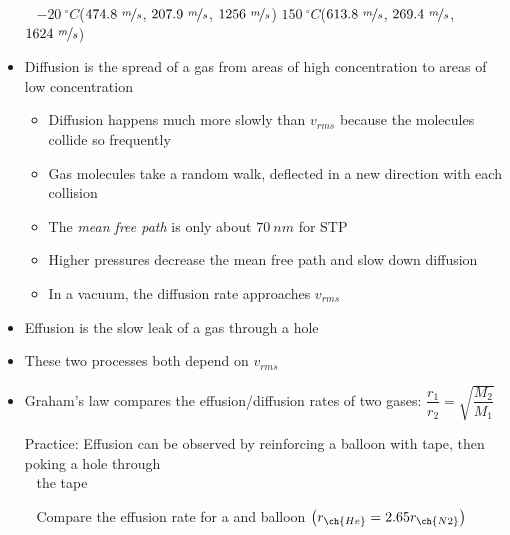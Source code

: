\documentclass[12pt, openany, letterpaper]{memoir}
\begin{document}
\begin{itemize}
	~\hphantom{Practice: } $-20~^\circ C$($474.8~\nicefrac{m}{s}$, $207.9~\nicefrac{m}{s}$, $1256~\nicefrac{m}{s}$)\hspace{1em} $150~^\circ C$($613.8~\nicefrac{m}{s}$, $269.4~\nicefrac{m}{s}$, $1624~\nicefrac{m}{s}$)
	\item Diffusion is the spread of a gas from areas of high concentration to areas of low concentration
	\begin{itemize}
		\item Diffusion happens much more slowly than $v_{rms}$ because the molecules collide so frequently
		\item Gas molecules take a random walk, deflected in a new direction with each collision
		\item The \emph{mean free path} is only about $70~nm$ for STP 
		\item Higher pressures decrease the mean free path and slow down diffusion
		\item In a vacuum, the diffusion rate approaches $v_{rms}$
	\end{itemize}
	\item Effusion is the slow leak of a gas through a hole
	\item These two processes both depend on $v_{rms}$
	\item Graham's law compares the effusion/diffusion rates of two gases: $\dfrac{r_1}{r_2}=\sqrt{\dfrac{M_2}{M_1}}$
	
	Practice: Effusion can be observed by reinforcing a balloon with tape, then poking a hole through\\
	~\hphantom{Practice: } the tape
	
	~\hphantom{Practice: } Compare the effusion rate for a  and  balloon $\left(r_{\ch{He}}=2.65r_{\ch{N2}}\right)$
\end{itemize}
\end{document}
